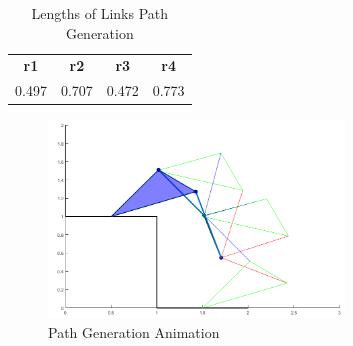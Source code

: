 \documentclass[12pt]{article}
\begin{document}
\begin{table}[H]
  \centering
  \caption{Lengths of Links Path Generation}
    \begin{tabular}{cccc}
    \textbf{r1}    & \textbf{r2}    & \textbf{r3}    & \textbf{r4} \\
    0.497 & 0.707 & 0.472 & 0.773 \\
    \end{tabular}%
\end{table}%
\begin{figure}[H]
    \centering
    \includegraphics[width=0.7\textwidth]{PG_3.png}
    \caption{Path Generation Animation}
    \label{fig:PG_animation}
\end{figure}
\end{document}
